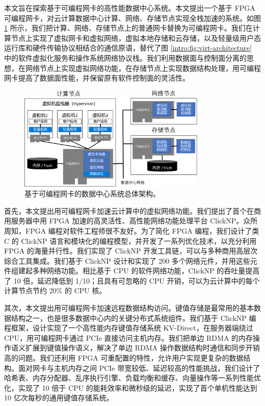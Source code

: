 本文旨在探索基于可编程网卡的高性能数据中心系统。本文提出一个基于 FPGA 可编程网卡，对云计算数据中心计算、网络、存储节点实现全栈加速的系统。如图 \ref{intro:fig:accel-arch} 所示，我们把计算、网络、存储节点上的普通网卡替换为可编程网卡。我们在计算节点上实现了虚拟网卡和虚拟网络，虚拟本地存储和云存储，以及轻量级用户态运行库和硬件传输协议相结合的通信原语，替代了图 \ref{intro:fig:virt-architecture} 中的软件虚拟化服务和操作系统网络协议栈。我们利用数据面与控制面分离的思想，在网络节点上实现虚拟网络功能，在存储节点上实现数据结构处理，用可编程网卡提高了数据面性能，并保留原有软件控制面的灵活性。


\begin{figure}[htbp]
	\centering
	\includegraphics[width=0.8\textwidth]{figures/accel_arch.pdf}
	\caption{基于可编程网卡的数据中心系统总体架构。}
	\label{intro:fig:accel-arch}
\end{figure}

首先，本文提出用可编程网卡加速云计算中的虚拟网络功能。我们提出了首个在商用服务器中用 FPGA 加速的高灵活性、高性能网络功能处理平台 ClickNP。众所周知，FPGA 编程对软件工程师很不友好。为了简化 FPGA 编程，我们设计了类 C 的 ClickNP 语言和模块化的编程模型，并开发了一系列优化技术，以充分利用 FPGA 的海量并行性。我们实现了 ClickNP 开发工具链，可以与多种商用高层次综合工具集成。我们基于 ClickNP 设计和实现了 200 多个网络元件，并用这些元件组建起多种网络功能。相比基于 CPU 的软件网络功能，ClickNP 的吞吐量提高了 10 倍，延迟降低到 1/10；且具有可忽略的 CPU 开销，可以为云计算中的每个计算节点节约 20\% 的 CPU 核。

其次，本文提出用可编程网卡加速远程数据结构访问。键值存储是最常用的基本数据结构之一，也是很多数据中心内的关键分布式系统组件。我们基于 ClickNP 编程框架，设计实现了一个高性能内存键值存储系统 KV-Direct，在服务器端绕过 CPU，用可编程网卡通过 PCIe 直接访问主机内存。我们把单边 RDMA 的内存操作语义扩展到键值操作语义，解决了单边 RDMA 操作数据结构时通信和同步开销高的问题。我们还利用 FPGA 可重配置的特性，允许用户实现更复杂的数据结构。面对网卡与主机内存之间 PCIe 带宽较低、延迟较高的性能挑战，我们设计了哈希表、内存分配器、乱序执行引擎、负载均衡和缓存、向量操作等一系列性能优化，实现了 10 倍于 CPU 的能耗效率和微秒级的延迟，实现了首个单机性能达到 10 亿次每秒的通用键值存储系统。

